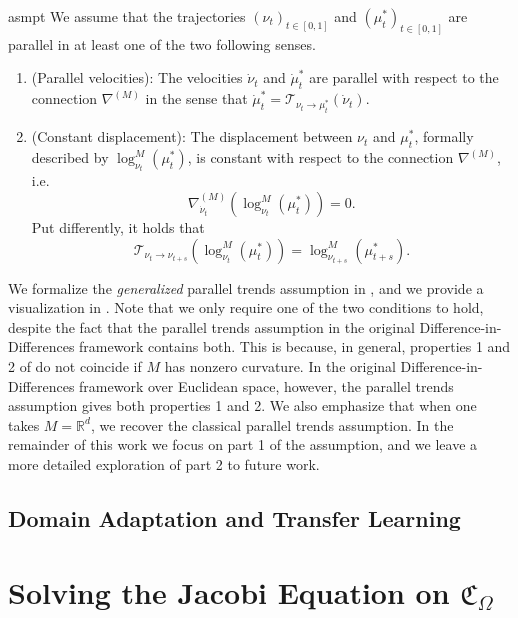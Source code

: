 \documentclass[11pt]{article}
\newcommand{\man}{M}
\begin{document}
\begin{restatable}{asmpt}{} \label{riemannian parallel trends}
    We assume that the trajectories $(\nu_t)_{t\in [0, 1]}$ and $(\mu_t^*)_{t\in [0, 1]}$ are parallel in at least one of the two following senses.
    \begin{enumerate}
        \item (Parallel velocities): The velocities $\dot \nu_t$ and $\dot \mu_t^*$ are parallel with respect to the connection $\nabla^{(\man)}$ in the sense that $\dot \mu_t^* = \mathcal{T}_{\nu_t \rightarrow \mu_t^*}(\dot \nu_t)$.
        \item (Constant displacement): The displacement between $\nu_t$ and $\mu_t^*$, formally described by $\log^\man_{\nu_t}(\mu_t^*)$, is constant with respect to the connection $\nabla^{(\man)}$, i.e.
        \[\nabla^{(\man)}_{\dot \nu_t}\left(\log^\man_{\nu_t}(\mu_t^*)\right) = 0.\]
        Put differently, it holds that
        \[\mathcal{T}_{\nu_t \rightarrow \nu_{t+s}}\left(\log^\man_{\nu_t}(\mu_{t}^*)\right) = \log^\man_{\nu_{t+s}}(\mu_{t+s}^*).\]
    \end{enumerate}
\end{restatable}
We formalize the \textit{generalized} parallel trends assumption in , and we provide a visualization in . Note that we only require one of the two conditions to hold, despite the fact that the parallel trends assumption in the original Difference-in-Differences framework contains both. This is because, in general, properties 1 and 2 of  do not coincide if $\man$ has nonzero curvature. In the original Difference-in-Differences framework over Euclidean space, however, the parallel trends assumption gives both properties 1 and 2. We also emphasize that when one takes $\man = \mathbb{R}^d$, we recover the classical parallel trends assumption. In the remainder of this work we focus on part 1 of the assumption, and we leave a more detailed exploration of part 2 to future work.

\subsection{Domain Adaptation and Transfer Learning}


\clearpage
\appendix

\section{Solving the Jacobi Equation on $\mathfrak{C}_\Omega$} \label{sec: solving the jacobi equation}
\end{document}
